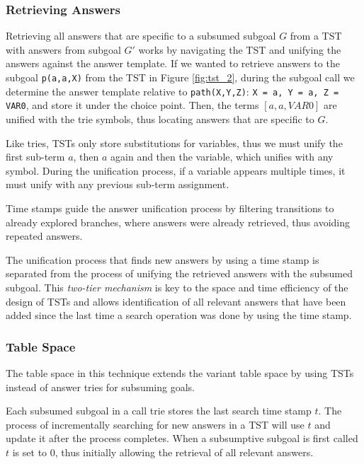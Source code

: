 \subsubsection{Retrieving Answers}

Retrieving all answers that are specific to a subsumed subgoal $G$ from a TST with answers from subgoal $G'$
works by navigating the TST and unifying the answers against the answer template.
If we wanted to retrieve answers to the subgoal \texttt{p(a,a,X)} from the TST in Figure \ref{fig:tst_2},
during the subgoal call we determine the answer template relative to \texttt{path(X,Y,Z)}:
\texttt{X = a, Y = a, Z = VAR0},
and store it under the choice point. Then, the terms $[a, a, VAR0]$ are unified
with the trie symbols, thus locating answers that are specific to $G$.

Like tries, TSTs only store substitutions for variables, thus we must unify
the first sub-term $a$, then $a$ again and then the variable, which unifies with any symbol.
During the unification process, if a variable appears multiple times, it must unify with
any previous sub-term assignment.

Time stamps guide the answer unification process by filtering transitions to already explored branches, where
answers were already retrieved, thus avoiding repeated answers.

The unification process that finds new answers by using a time stamp is separated from the process
of unifying the retrieved answers with the subsumed subgoal. This \textit{two-tier mechanism} is key to the space and time
efficiency of the design of TSTs \cite{Johnson-99} and allows identification of all relevant answers that have
been added since the last time a search operation was done by using the time stamp.

\subsubsection{Table Space}

The table space in this technique extends the variant table space by
using TSTs instead of answer tries for subsuming goals.
 
Each subsumed subgoal in a call trie stores the last search time stamp $t$. The process of
incrementally searching for new answers in a TST will use $t$ and update it after the process completes.
When a subsumptive subgoal is first called $t$ is set to $0$, thus initially allowing the retrieval of all
relevant answers.

